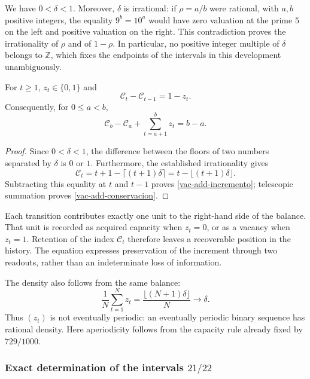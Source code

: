 We have \(0<\delta<1\). Moreover, \(\delta\) is irrational: if \(\rho=a/b\) were rational, with \(a,b\) positive integers, the equality \(9^b=10^a\) would have zero valuation at the prime \(5\) on the left and positive valuation on the right. This contradiction proves the irrationality of \(\rho\) and of \(1-\rho\). In particular, no positive integer multiple of \(\delta\) belongs to \(\mathbb Z\), which fixes the endpoints of the intervals in this development unambiguously.

\begin{proposition}
\label{vac-add-balance}
For \(t\geq1\), \(z_t\in\{0,1\}\) and
\begin{equation}
 \mathcal C_t-\mathcal C_{t-1}=1-z_t.
 \label{vac-add-incremento}
\end{equation}
Consequently, for \(0\leq a<b\),
\begin{equation}
 \mathcal C_b-\mathcal C_a+
 \sum_{t=a+1}^{b}z_t=b-a.
 \label{vac-add-conservacion}
\end{equation}
\end{proposition}
\begin{proof}
Since \(0<\delta<1\), the difference between the floors of two numbers separated by \(\delta\) is \(0\) or \(1\). Furthermore, the established irrationality gives
\[
 \mathcal C_t=t+1-\lceil(t+1)\delta\rceil
             =t-\lfloor(t+1)\delta\rfloor.
\]
Subtracting this equality at \(t\) and \(t-1\) proves \eqref{vac-add-incremento}; telescopic summation proves \eqref{vac-add-conservacion}.
\end{proof}

Each transition contributes exactly one unit to the right-hand side of the balance. That unit is recorded as acquired capacity when \(z_t=0\), or as a vacancy when \(z_t=1\). Retention of the index \(\mathcal C_t\) therefore leaves a recoverable position in the history. The equation expresses preservation of the increment through two readouts, rather than an indeterminate loss of information.

The density also follows from the same balance:
\[
 \frac1N\sum_{t=1}^{N}z_t
 =\frac{\lfloor(N+1)\delta\rfloor}{N}\longrightarrow\delta.
\]
Thus \((z_t)\) is not eventually periodic: an eventually periodic binary sequence has rational density. Here aperiodicity follows from the capacity rule already fixed by \(729/1000\).

\subsubsection{Exact determination of the intervals \(21/22\)}
\label{vac-add-primarios}

